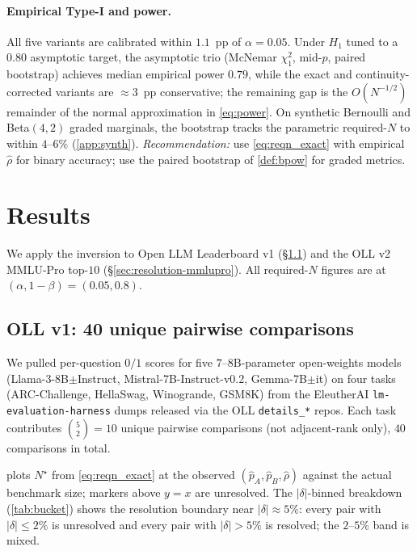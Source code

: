 \documentclass{article}
\theoremstyle{plain}
\theoremstyle{definition}
\begin{document}
\paragraph{Empirical Type-I and power.} All five variants are calibrated within $1.1$~pp of $\alpha=0.05$. Under $H_1$ tuned to a $0.80$ asymptotic target, the asymptotic trio (McNemar $\chi^2_1$, mid-$p$, paired bootstrap) achieves median empirical power $0.79$, while the exact and continuity-corrected variants are ${\approx}3$~pp conservative; the remaining gap is the $O(N^{-1/2})$ remainder of the normal approximation in \cref{eq:power}. On synthetic Bernoulli and Beta$(4,2)$ graded marginals, the bootstrap tracks the parametric required-$N$ to within $4$--$6\%$ (\cref{app:synth}). \emph{Recommendation:} use \cref{eq:reqn_exact} with empirical $\hat\rho$ for binary accuracy; use the paired bootstrap of \cref{def:bpow} for graded metrics.

\section{Results}
\label{sec:resolution}

We apply the inversion to Open LLM Leaderboard v1 (\S\ref{sec:resolution-v1}) and the OLL v2 MMLU-Pro top-$10$ (\S\ref{sec:resolution-mmlupro}). All required-$N$ figures are at $(\alpha,1{-}\beta)=(0.05,0.8)$.

\subsection{OLL v1: 40 unique pairwise comparisons}
\label{sec:resolution-v1}

We pulled per-question $0/1$ scores for five $7$--$8$B-parameter open-weights models (Llama-3-8B$\pm$Instruct, Mistral-7B-Instruct-v0.2, Gemma-7B$\pm$it) on four tasks (ARC-Challenge, HellaSwag, Winogrande, GSM8K) from the EleutherAI \texttt{lm-evaluation-harness} dumps released via the OLL \texttt{details\_*} repos. Each task contributes $\binom{5}{2}=10$ unique pairwise comparisons (not adjacent-rank only), $40$ comparisons in total.

 plots $N^{\star}$ from \cref{eq:reqn_exact} at the observed $(\hat p_A,\hat p_B,\hat\rho)$ against the actual benchmark size; markers above $y=x$ are unresolved. The $|\delta|$-binned breakdown (\cref{tab:bucket}) shows the resolution boundary near $|\delta|\approx 5\%$: every pair with $|\delta|\leq 2\%$ is unresolved and every pair with $|\delta|>5\%$ is resolved; the $2$--$5\%$ band is mixed.
\end{document}
